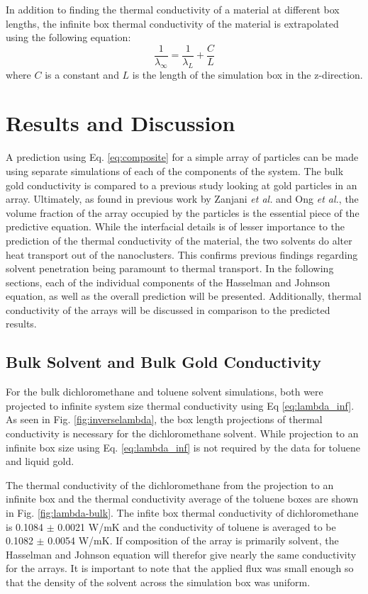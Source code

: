 In addition to finding the thermal conductivity of a material at different box lengths, the infinite box thermal conductivity of the material is extrapolated using the following equation:
\begin{equation}
    \frac{1}{\lambda_{\infty}}= \frac{1}{\lambda_L} +\frac{C}{L}
    \label{eq:lambda_inf}
\end{equation}
where $C$ is a constant and $L$ is the length of the simulation box in the z-direction.\cite{Hannah2015} 

\section{Results and Discussion}
A prediction using Eq. \ref{eq:composite} for a simple array of  particles can be made using separate simulations of each of the components of the system.
The bulk gold conductivity is compared to a previous study looking at gold particles in an array. 
Ultimately, as found in previous work by Zanjani \textit{et al.}\cite{Zanjani2014} and Ong \textit{et al.}\cite{Ong:2014yq}, the volume fraction of the array occupied by the particles is the essential piece of the predictive equation.
While the interfacial details is of lesser importance to the prediction of the thermal conductivity of the material, the two solvents do alter heat transport out of the nanoclusters.
This confirms previous findings regarding solvent penetration being paramount to thermal transport.
In the following sections, each of the individual components of the Hasselman and Johnson equation, as well as the overall prediction will be presented.
Additionally, thermal conductivity of the arrays will be discussed in comparison to the predicted results.

\subsection{Bulk Solvent and Bulk Gold Conductivity}
For the bulk dichloromethane and toluene solvent simulations, both were projected to infinite system size thermal conductivity using Eq \ref{eq:lambda_inf}. 
As seen in Fig. \ref{fig:inverselambda}, the box length projections of thermal conductivity is necessary for the dichloromethane solvent.
While projection to an infinite box size using Eq. \ref{eq:lambda_inf} is not required by the data for toluene and liquid gold.

The thermal conductivity of the dichloromethane from the projection to an infinite box and the thermal conductivity average of the toluene boxes are shown in Fig. \ref{fig:lambda-bulk}.
The infite box thermal conductivity of dichloromethane is 0.1084 $\pm$ 0.0021 W/mK and the conductivity of toluene is averaged to be 0.1082 $\pm$ 0.0054 W/mK.
If composition of the array is primarily solvent, the Hasselman and Johnson equation will therefor give nearly the same conductivity for the arrays.
It is important to note that the applied flux was small enough so that the density of the solvent across the simulation box was uniform.

